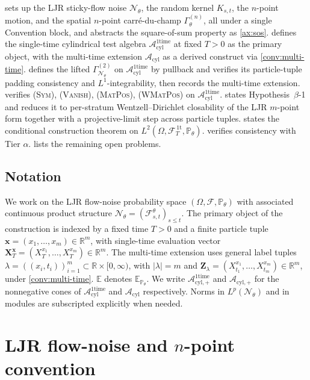 \documentclass[11pt,reqno]{amsart}
\theoremstyle{plain}
\theoremstyle{definition}
\theoremstyle{remark}
\newcommand{\R}{\mathbb R}
\newcommand{\E}{\mathbb E}
\newcommand{\Prob}{\mathbb P}
\newcommand{\cA}{\mathcal A}
\newcommand{\cF}{\mathcal F}
\newcommand{\cN}{\mathcal N}
\newcommand{\Acyl}{\cA_{\mathrm{cyl}}}
\newcommand{\Acylp}{\cA_{\mathrm{cyl},+}}
\newcommand{\Aone}{\cA_{\mathrm{cyl}}^{\mathrm{1time}}}
\newcommand{\Aonep}{\cA_{\mathrm{cyl},+}^{\mathrm{1time}}}
\newcommand{\FT}{\cF_{T}^{\,\mathrm{1t}}}
\newcommand{\Hone}{L^{2}(\Omega,\FT,\Pth)}
\newcommand{\GamN}{\Gamma^{(2)}_{\cN_{\theta}}}
\newcommand{\GamM}[1]{\Gamma^{(#1)}_{\theta}}
\newcommand{\Pth}{\Prob_{\theta}}
\begin{document}
 sets up the LJR sticky-flow noise $\cN_{\theta}$, the
random kernel $K_{s,t}$, the $n$-point motion, and the spatial
$n$-point carr\'e-du-champ $\GamM{n}$, all under a single Convention
block, and abstracts the square-of-sum property as
\cref{ax:sos}.  defines the single-time
cylindrical test algebra $\Aone$ at fixed $T>0$ as the primary
object, with the multi-time extension $\Acyl$ as a derived
construct via \cref{conv:multi-time}.
 defines the lifted $\GamN$ on $\Aone$ by
pullback and verifies its particle-tuple padding consistency and
$L^{1}$-integrability, then records the multi-time extension.
 verifies {\normalfont\textsc{(Sym)}},
{\normalfont\textsc{(Vanish)}}, {\normalfont\textsc{(MatPos)}},
{\normalfont\textsc{(WMatPos)}} on $\Aone$. 
states Hypothesis~$\beta$-1 and reduces it to per-stratum
Wentzell--Dirichlet closability of the LJR $m$-point form together
with a projective-limit step across particle tuples.
 states the conditional construction theorem on
$\Hone$.  verifies consistency with Tier
$\alpha$.  lists the remaining open problems.

\subsection{Notation}\label{sec:intro-notation}

We work on the LJR flow-noise probability space
$(\Omega,\cF,\Pth)$ with associated continuous product structure
$\cN_{\theta}=(\cF^{\theta}_{s,t})_{s\le t}$. The primary object of
the construction is indexed by a fixed time $T>0$ and a finite
particle tuple $\mathbf x=(x_{1},\ldots,x_{m})\in\R^{m}$, with
single-time evaluation vector
$\mathbf X_{T}^{\mathbf x}=(X_{T}^{x_{1}},\ldots,X_{T}^{x_{m}})\in\R^{m}$.
The multi-time extension uses general label tuples
$\lambda=((x_{i},t_{i}))_{i=1}^{m}\subset\R\times[0,\infty)$, with
$|\lambda|=m$ and
$\mathbf Z_{\lambda}=(X^{x_{1}}_{t_{1}},\ldots,X^{x_{m}}_{t_{m}})\in\R^{m}$,
under \cref{conv:multi-time}.
$\E$ denotes $\E_{\Pth}$. We write $\Aonep$ and $\Acylp$ for the
nonnegative cones of $\Aone$ and $\Acyl$ respectively. Norms in
$L^{p}(\cN_{\theta})$ and in modules are subscripted explicitly
when needed.

\section{LJR flow-noise and \texorpdfstring{$n$}{n}-point convention}\label{sec:LJR}
\end{document}
